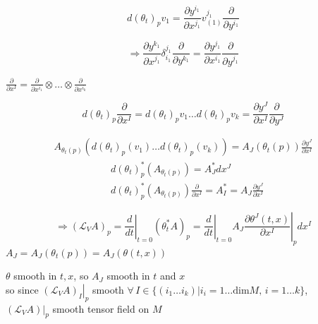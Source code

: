 \documentclass[11pt]{amsart}
\theoremstyle{definition}
\begin{document}
\[
d(\theta_t)_p v_1  = \frac{ \partial y^{i_1}}{ \partial x^{j_1}} v^{j_1}_{(1)} \frac{ \partial }{ \partial y^{i_1}}
\]


\[
\Longrightarrow \frac{ \partial y^{k_1} }{ \partial x^{j_1} } \delta^{j_1}_{i_1} \frac{ \partial }{ \partial y^{k_1}} = \frac{ \partial y^{j_1}}{ \partial x^{i_1}} \frac{ \partial }{ \partial y^{j_1}}
\]

$\frac{ \partial }{ \partial x^I} = \frac{ \partial }{ \partial x^{i_1} } \otimes \dots \otimes \frac{ \partial }{ \partial x^{i_k} }$

\[
d(\theta_t)_p \frac{ \partial }{ \partial x^I} = d(\theta_t)_pv_1 \dots d(\theta_t)_pv_k =  \frac{ \partial y^J}{ \partial x^I} \frac{ \partial }{ \partial y^J}
\]







\[
\begin{gathered}
  A_{\theta_t(p)}(d(\theta_t)_p(v_1) \dots d(\theta_t)_p(v_k) ) = A_J(\theta_t(p))\frac{ \partial y^J}{ \partial x^I}
\end{gathered}
\]
\[
\begin{aligned}
  & d(\theta_t)^*_p(A_{\theta_t(p)}) = A^*_J dx^J \\
  &  d(\theta_t)^*_p(A_{\theta_t(p)}) \frac{ \partial }{ \partial x^I} = A_I^* = A_J \frac{ \partial y^J}{ \partial x^I }
\end{aligned}
\]

\[
\Longrightarrow ( \mathcal{L}_VA)_p = \left. \frac{d}{dt} \right|_{t=0} (\theta_t^* A)_p = \left. \frac{d}{dt} \right|_{t=0} A_J \left. \frac{ \partial \theta^J(t,x) }{ \partial x^I } \right|_p dx^I
\]
$A_J = A_J(\theta_t(p)) = A_J(\theta(t,x))$

$\theta$ smooth in $t,x$, so $A_J$ smooth in $t$ and $x$  \\

so since $\left. \left( \mathcal{L}_VA\right)_I \right|_p$ smooth $\forall \, I \in \lbrace (i_1 \dots i_k) | i_i = 1 \dots \text{dim}{M}, \, i = 1 \dots k \rbrace$, \\
\quad $\left. (\mathcal{L}_VA)  \right|_p$ smooth tensor field on $M$
\end{document}

